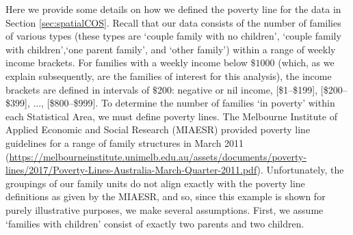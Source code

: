 \documentclass[article]{jss}
\begin{document}
\begin{appendix}
Here we provide some details on how we defined the poverty line for the data in Section \ref{sec:spatialCOS}. 
 Recall that our data consists of the number of families of various types (these types are `couple family with no children', `couple family with children',`one parent family', and `other family') within a range of weekly income brackets. 
For families with a weekly income below $\$1000$ (which, as we explain subsequently, are the families of interest for this analysis), the income brackets are defined in intervals of $\$200$: negative or nil income, 
[\$1--\$199], [\$200--\$399], ..., [\$800--\$999]. 
To determine the number of families `in poverty' within each Statistical Area, we must define poverty lines. 
The Melbourne Institute of Applied Economic and Social Research (MIAESR) provided poverty line guidelines for a range of family structures in March 2011 (\url{https://melbourneinstitute.unimelb.edu.au/assets/documents/poverty-lines/2017/Poverty-Lines-Australia-March-Quarter-2011.pdf}).
Unfortunately, the groupings of our family units do not align exactly with the poverty line definitions as given by the MIAESR, and so, since this example is shown for purely illustrative purposes, we make several assumptions. 
First, we assume `families with children' consist of exactly two parents and two children.

\end{appendix}
\end{document}
